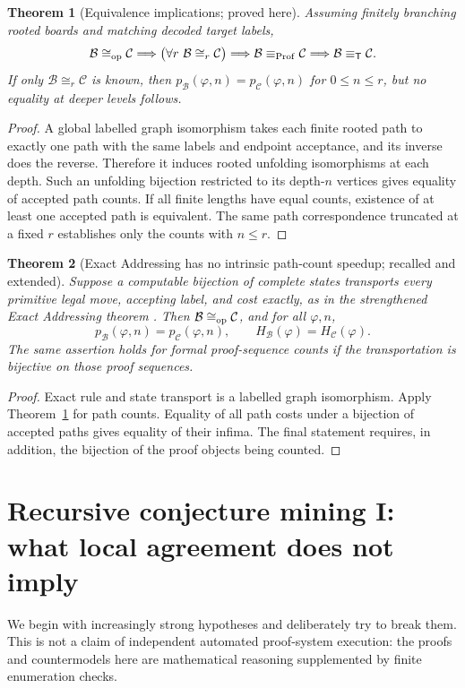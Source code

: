 \documentclass[11pt,letterpaper]{article}
\newtheorem{theorem}{Theorem}[section]
\theoremstyle{definition}
\newcommand{\Prof}{\operatorname{Prof}}
\newcommand{\B}{\mathcal B}
\newcommand{\T}{\mathsf T}
\newcommand{\eqT}{\equiv_{\T}}
\begin{document}
\begin{theorem}[Equivalence implications; proved here]\label{thm:implications}
Assuming finitely branching rooted boards and matching decoded target labels,
\[
\B\cong_{\rm op}\mathcal C
\Longrightarrow\bigl(\forall r\ \B\cong_r\mathcal C\bigr)
\Longrightarrow\B\equiv_{\Prof}\mathcal C
\Longrightarrow\B\eqT\mathcal C.
\]
If only $\B\cong_r\mathcal C$ is known, then $p_\B(\varphi,n)=p_{\mathcal C}(\varphi,n)$ for $0\le n\le r$, but no equality at deeper levels follows.
\end{theorem}
\begin{proof}
A global labelled graph isomorphism takes each finite rooted path to exactly one path with the same labels and endpoint acceptance, and its inverse does the reverse. Therefore it induces rooted unfolding isomorphisms at each depth. Such an unfolding bijection restricted to its depth-$n$ vertices gives equality of accepted path counts. If all finite lengths have equal counts, existence of at least one accepted path is equivalent. The same path correspondence truncated at a fixed $r$ establishes only the counts with $n\le r$.
\end{proof}

\begin{theorem}[Exact Addressing has no intrinsic path-count speedup; recalled and extended]\label{thm:exact}
Suppose a computable bijection of complete states transports every primitive legal move, accepting label, and cost exactly, as in the strengthened Exact Addressing theorem \cite{exact}. Then $\B\cong_{\rm op}\mathcal C$, and for all $\varphi,n$,
\[
p_\B(\varphi,n)=p_{\mathcal C}(\varphi,n),\qquad H_\B(\varphi)=H_{\mathcal C}(\varphi).
\]
The same assertion holds for formal proof-sequence counts if the transportation is bijective on those proof sequences.
\end{theorem}
\begin{proof}
Exact rule and state transport is a labelled graph isomorphism. Apply Theorem~\ref{thm:implications} for path counts. Equality of all path costs under a bijection of accepted paths gives equality of their infima. The final statement requires, in addition, the bijection of the proof objects being counted.
\end{proof}

\section{Recursive conjecture mining I: what local agreement does not imply}
We begin with increasingly strong hypotheses and deliberately try to break them. This is not a claim of independent automated proof-system execution: the proofs and countermodels here are mathematical reasoning supplemented by finite enumeration checks.
\end{document}
